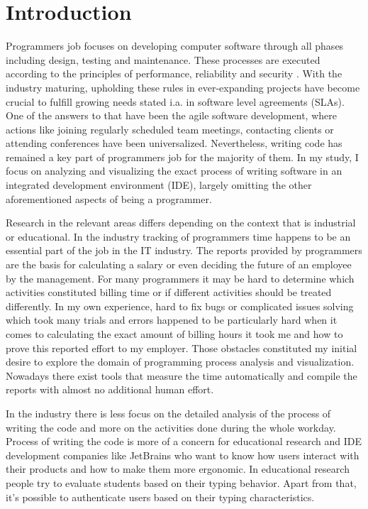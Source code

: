 \chapter{Introduction}

Programmers job focuses on developing computer software through all phases including design, testing and maintenance. These processes are executed according to the principles of performance, reliability and security \cite{Sto21ProgrammersDo}. With the industry maturing, upholding these rules in ever-expanding projects have become crucial to fulfill growing needs stated i.a. in software level agreements (SLAs). One of the answers to that have been the agile software development, where actions like joining regularly scheduled team meetings, contacting clients or attending conferences have been universalized. Nevertheless, writing code has remained a key part of programmers job for the majority of them. In my study, I focus on analyzing and visualizing the exact process of writing software in an integrated development environment (IDE), largely omitting the other aforementioned aspects of being a programmer.

Research in the relevant areas differs depending on the context that is industrial or educational. In the industry tracking of programmers time happens to be an essential part of the job in the IT industry. The reports provided by programmers are the basis for calculating a salary or even deciding the future of an employee by the management. For many programmers it may be hard to determine which activities constituted billing time or if different activities should be treated differently. In my own experience, hard to fix bugs or complicated issues solving which took many trials and errors happened to be particularly hard when it comes to calculating the exact amount of billing hours it took me and how to prove this reported effort to my employer. Those obstacles constituted my initial desire to explore the domain of programming process analysis and visualization. Nowadays there exist tools that measure the time automatically and compile the reports with almost no additional human effort.

In the industry there is less focus on the detailed analysis of the process of writing the code and more on the activities done during the whole workday. Process of writing the code is more of a concern for educational research and IDE development companies like JetBrains who want to know how users interact with their products and how to make them more ergonomic. In educational research people try to evaluate students based on their typing behavior. Apart from that, it's possible to authenticate users based on their typing characteristics.

